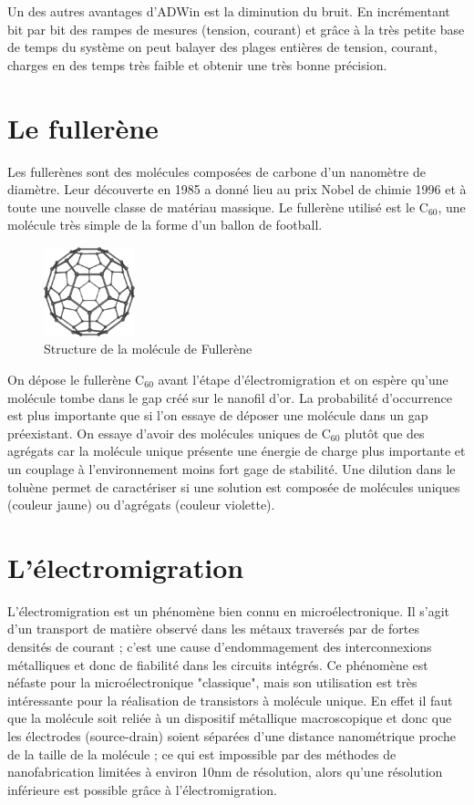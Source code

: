 Un des autres avantages d'ADWin est la diminution du bruit. En incrémentant bit par bit des rampes de mesures (tension, courant) et grâce à la très petite base de temps du système on peut balayer des plages entières de tension, courant, charges en des temps très faible et obtenir une très bonne précision.

\section{Le fullerène}
Les fullerènes sont des molécules composées de carbone d'un nanomètre de diamètre. Leur découverte en 1985 a donné lieu au prix Nobel de chimie 1996 et à toute une nouvelle classe de matériau massique. Le fullerène utilisé est le C$_{60}$, une molécule très simple de la forme d'un ballon de football.

\begin{figure}[h]
    \begin{center}
        \includegraphics[width=100px]{Images/2_C60.png}
        \caption{Structure de la molécule de Fullerène}
    \end{center}
\end{figure}

On dépose le fullerène C$_{60}$ avant l'étape d'électromigration et on espère qu'une molécule tombe dans le gap créé sur le nanofil d'or. La probabilité d'occurrence est plus importante que si l'on essaye de déposer une molécule dans un gap préexistant. On essaye d'avoir des molécules uniques de C$_{60}$ plutôt que des agrégats car la molécule unique présente une énergie de charge plus importante et un couplage à l'environnement moins fort gage de stabilité. Une dilution dans le toluène permet de caractériser si une solution est composée de molécules uniques (couleur jaune) ou d'agrégats (couleur violette).


\section{L'électromigration}
L'électromigration est un phénomène bien connu en microélectronique. Il s'agit d'un transport de matière observé dans les métaux traversés par de fortes densités de courant ; c'est une cause d'endommagement des interconnexions métalliques et donc de fiabilité dans les circuits intégrés\cite{8}. Ce phénomène est néfaste pour la microélectronique "classique", mais son utilisation est très intéressante pour la réalisation de transistors à molécule unique. En effet il faut que la molécule soit reliée à un dispositif métallique macroscopique et donc que les électrodes (source-drain) soient séparées d'une distance nanométrique proche de la taille de la molécule ; ce qui est impossible par des méthodes de nanofabrication limitées à environ 10nm de résolution, alors qu'une résolution inférieure est possible grâce à l'électromigration\cite{9}.\medskip 


